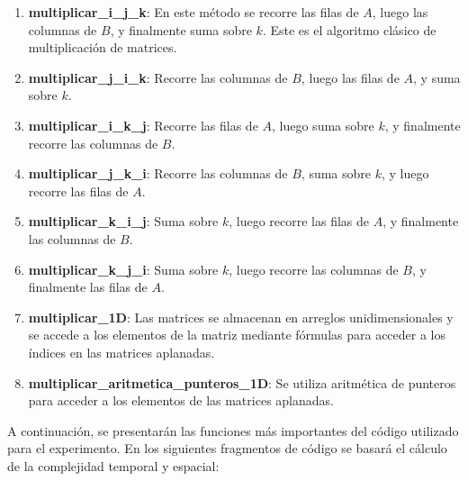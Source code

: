 \documentclass[10pt]{article}
\begin{document}
\begin{enumerate}
    \item \textbf{multiplicar\_i\_j\_k}: En este método se recorre las filas de $A$, luego las columnas de $B$, y finalmente suma sobre $k$. Este es el algoritmo clásico de multiplicación de matrices.
    \item \textbf{multiplicar\_j\_i\_k}: Recorre las columnas de $B$, luego las filas de $A$, y suma sobre $k$.
    \item \textbf{multiplicar\_i\_k\_j}: Recorre las filas de $A$, luego suma sobre $k$, y finalmente recorre las columnas de $B$.
    \item \textbf{multiplicar\_j\_k\_i}: Recorre las columnas de $B$, suma sobre $k$, y luego recorre las filas de $A$.
    \item \textbf{multiplicar\_k\_i\_j}: Suma sobre $k$, luego recorre las filas de $A$, y finalmente las columnas de $B$.
    \item \textbf{multiplicar\_k\_j\_i}: Suma sobre $k$, luego recorre las columnas de $B$, y finalmente las filas de $A$.
    \item \textbf{multiplicar\_1D}: Las matrices se almacenan en arreglos unidimensionales y se accede a los elementos de la matriz mediante fórmulas para acceder a los índices en las matrices aplanadas.
    \item \textbf{multiplicar\_aritmetica\_punteros\_1D}: Se utiliza aritmética de punteros para acceder a los elementos de las matrices aplanadas.
\end{enumerate}

A continuación, se presentarán las funciones más importantes del código utilizado para el experimento. En los siguientes fragmentos de código se basará el cálculo de la complejidad temporal y espacial:
\end{document}
